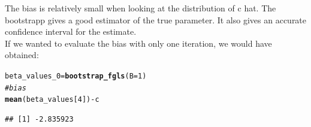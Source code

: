 \documentclass[11pt]{article}\usepackage[]{graphicx}\usepackage[]{color}
\makeatletter
\newcommand{\hlnum}[1]{\textcolor[rgb]{0.686,0.059,0.569}{#1}}%
\newcommand{\hlcom}[1]{\textcolor[rgb]{0.678,0.584,0.686}{\textit{#1}}}%
\newcommand{\hlopt}[1]{\textcolor[rgb]{0,0,0}{#1}}%
\newcommand{\hlstd}[1]{\textcolor[rgb]{0.345,0.345,0.345}{#1}}%
\newcommand{\hlkwb}[1]{\textcolor[rgb]{0.69,0.353,0.396}{#1}}%
\newcommand{\hlkwc}[1]{\textcolor[rgb]{0.333,0.667,0.333}{#1}}%
\newcommand{\hlkwd}[1]{\textcolor[rgb]{0.737,0.353,0.396}{\textbf{#1}}}%
\newenvironment{kframe}{%
 \def\at@end@of@kframe{}%
 \ifinner\ifhmode%
  \def\at@end@of@kframe{\end{minipage}}%
  \begin{minipage}{\columnwidth}%
 \fi\fi%
 \def\FrameCommand##1{\hskip\@totalleftmargin \hskip-\fboxsep
 \colorbox{shadecolor}{##1}\hskip-\fboxsep
     \hskip-\linewidth \hskip-\@totalleftmargin \hskip\columnwidth}%
 \MakeFramed {\advance\hsize-\width
   \@totalleftmargin\z@ \linewidth\hsize
   \@setminipage}}%
 {\par\unskip\endMakeFramed%
 \at@end@of@kframe}
\newenvironment{knitrout}{}{} %
\makeatother
\begin{document}
The bias is relatively small when looking at the distribution of c hat. The bootstrapp gives a good estimator of the true parameter. It also gives an accurate confidence interval for the estimate.
\\
If we wanted to evaluate the bias with only one iteration, we would
have obtained:
\begin{knitrout}
\color{fgcolor}\begin{kframe}
\begin{alltt}
\hlstd{beta_values_0} \hlkwb{=} \hlkwd{bootstrap_fgls}\hlstd{(}\hlkwc{B}\hlstd{=}\hlnum{1}\hlstd{)}
\hlcom{# bias}
\hlkwd{mean}\hlstd{(beta_values[}\hlnum{4}\hlstd{])}\hlopt{-}\hlstd{c}
\end{alltt}
\begin{lstlisting}[basicstyle=\ttfamily,breaklines=true]
## [1] -2.835923
\end{lstlisting}
\end{kframe}
\end{knitrout}
\end{document}
